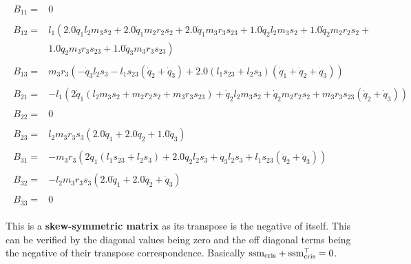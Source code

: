 \begin{align}
    \begin{split}
        B_{11} =& 0
    \end{split}
    \nonumber \\
    \begin{split}
        B_{12} =& l_{1} \left(2.0 \dot{q}_1 l_{2} m_{3} s_{2} + 2.0 \dot{q}_1 m_{2} r_{2} s_{2} + 2.0 \dot{q}_1 m_{3} r_{3} s_{23} + 1.0 \dot{q}_2 l_{2} m_{3} s_{2} + 1.0 \dot{q}_2 m_{2} r_{2} s_{2} + \right. \\
            & \left. 1.0 \dot{q}_2 m_{3} r_{3} s_{23} + 1.0 \dot{q}_3 m_{3} r_{3} s_{23}\right)
    \end{split}
    \nonumber \\
    \begin{split}
        B_{13} =& m_{3} r_{3} \left(- \dot{q}_3 l_{2} s_{3} - l_{1} s_{23} \left(\dot{q}_2 + \dot{q}_3\right) + 2.0 \left(l_{1} s_{23} + l_{2} s_{3}\right) \left(\dot{q}_1 + \dot{q}_2 + \dot{q}_3\right)\right)
    \end{split}
    \\
    \begin{split}
        B_{21} =& - l_{1} \left(2 \dot{q}_1 \left(l_{2} m_{3} s_{2} + m_{2} r_{2} s_{2} + m_{3} r_{3} s_{23}\right) + \dot{q}_2 l_{2} m_{3} s_{2} + \dot{q}_2 m_{2} r_{2} s_{2} + m_{3} r_{3} s_{23} \left(\dot{q}_2 + \dot{q}_3\right)\right)
    \end{split}
    \nonumber \\
    \begin{split}
        B_{22} =& 0
    \end{split}
    \nonumber \\
    \begin{split}
        B_{23} =& l_{2} m_{3} r_{3} s_{3} \left(2.0 \dot{q}_1 + 2.0 \dot{q}_2 + 1.0 \dot{q}_3\right)
    \end{split}
    \\
    \begin{split}
        B_{31} =& - m_{3} r_{3} \left(2 \dot{q}_1 \left(l_{1} s_{23} + l_{2} s_{3}\right) + 2.0 \dot{q}_2 l_{2} s_{3} + \dot{q}_3 l_{2} s_{3} + l_{1} s_{23} \left(\dot{q}_2 + \dot{q}_3\right)\right)
    \end{split}
    \nonumber \\
    \begin{split}
        B_{32} =& - l_{2} m_{3} r_{3} s_{3} \left(2.0 \dot{q}_1 + 2.0 \dot{q}_2 + \dot{q}_3\right)
    \end{split}
    \nonumber \\
    \begin{split}
        B_{33} =& 0
    \end{split}
\end{align}

This is a \textbf{skew-symmetric matrix} as its transpose is the negative of itself. This can be verified by the diagonal values being zero and the off diagonal terms being the negative of their transpose correspondence. Basically $\textup{ssm}_{\textup{cris}} + \textup{ssm}_{\textup{cris}}^\top = 0$.

